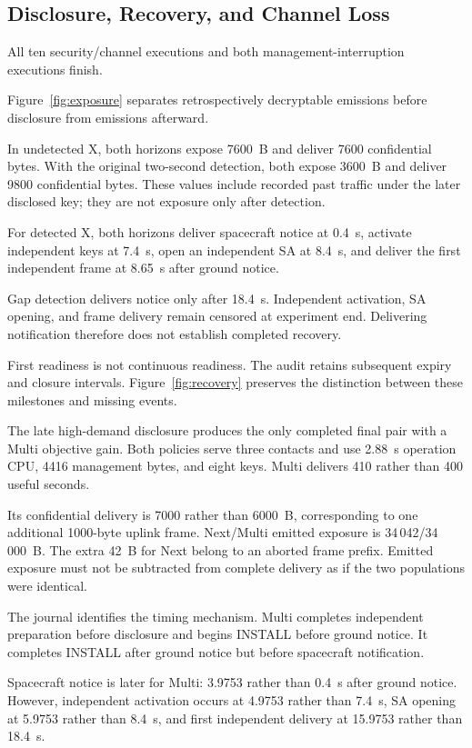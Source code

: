 \documentclass[conference]{IEEEtran}
\begin{document}
\subsection{Disclosure, Recovery, and Channel Loss}

All ten security/channel executions and both
management-interruption executions finish.

Figure~\ref{fig:exposure} separates retrospectively decryptable
emissions before disclosure from emissions afterward.

In undetected X, both horizons expose 7600~B and deliver
7600 confidential bytes.
With the original two-second detection, both expose 3600~B
and deliver 9800 confidential bytes.
These values include recorded past traffic under the later
disclosed key; they are not exposure only after detection.

For detected X, both horizons deliver spacecraft notice at
0.4~s, activate independent keys at 7.4~s, open an independent
SA at 8.4~s, and deliver the first independent frame at
8.65~s after ground notice.

Gap detection delivers notice only after 18.4~s.
Independent activation, SA opening, and frame delivery remain
censored at experiment end.
Delivering notification therefore does not establish completed
recovery.

First readiness is not continuous readiness.
The audit retains subsequent expiry and closure intervals.
Figure~\ref{fig:recovery} preserves the distinction between
these milestones and missing events.

The late high-demand disclosure produces the only completed
final pair with a Multi objective gain.
Both policies serve three contacts and use 2.88~s operation
CPU, 4416 management bytes, and eight keys.
Multi delivers 410 rather than 400 useful seconds.

Its confidential delivery is 7000 rather than 6000~B,
corresponding to one additional 1000-byte uplink frame.
Next/Multi emitted exposure is 34\,042/34\,000~B.
The extra 42~B for Next belong to an aborted frame prefix.
Emitted exposure must not be subtracted from complete delivery
as if the two populations were identical.

The journal identifies the timing mechanism.
Multi completes independent preparation before disclosure
and begins INSTALL before ground notice.
It completes INSTALL after ground notice but before
spacecraft notification.

Spacecraft notice is later for Multi:
3.9753 rather than 0.4~s after ground notice.
However, independent activation occurs at 4.9753 rather than
7.4~s, SA opening at 5.9753 rather than 8.4~s, and first
independent delivery at 15.9753 rather than 18.4~s.
\end{document}
